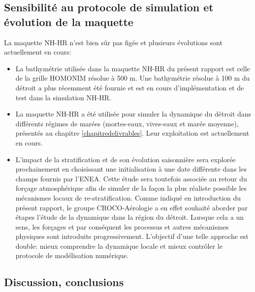 \documentclass[a4paper,11pt]{report}
\begin{document}
\subsection{Sensibilité au protocole de simulation et évolution de la maquette}
La maquette NH-HR n'est bien sûr pas figée et plusieurs évolutions sont actuellement en cours:
\begin{itemize}
 \item La bathymétrie utilisée dans la maquette NH-HR du présent rapport est celle de la grille HOMONIM résolue à 500 m. Une bathymétrie résolue à 100 m du détroit a plus récemment été fournie et est en cours d'implémentation et de test dans la simulation NH-HR.
 \item La maquette NH-HR a été utilisée pour simuler la dynamique du détroit dans différents régimes de marées (mortes-eaux, vives-eaux et marée moyenne), présentés au chapitre \ref{chapitredelivrables}. Leur exploitation est actuellement en cours.
 \item L'impact de la stratification et de son évolution saisonnière sera explorée prochainement en choisissant une initialisation à une date différente dans les champs fournis par l'ENEA. Cette étude sera toutefois associée au retour du forçage atmosphérique afin de simuler de la façon la plus réaliste possible les mécanismes locaux de re-stratification. Comme indiqué en introduction du présent rapport, le groupe CROCO-Aérologie a en effet souhaité aborder par étapes l'étude de la dynamique dans la région du détroit. Lorsque cela a un sens, les forçages et par conséquent les processus et autres mécanismes physiques sont introduits progressivement. L'objectif d'une telle approche est double: mieux comprendre la dynamique locale et mieux contrôler le protocole de modélisation numérique.
\end{itemize}

\subsection{Discussion, conclusions}
\end{document}
